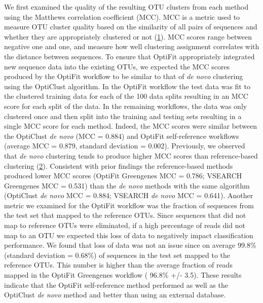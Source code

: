 \documentclass[
]{article}
\begin{document}
We first examined the quality of the resulting OTU clusters from each
method using the Matthews correlation coefficient (MCC). MCC is a metric
used to measure OTU cluster quality based on the similarity of all pairs
of sequences and whether they are appropriately clustered or not
(\protect\hyperlink{ref-westcott2015}{1}). MCC scores range between
negative one and one, and measure how well clustering assignment
correlates with the distance between sequences. To ensure that OptiFit
appropriately integrated new sequence data into the existing OTUs, we
expected the MCC scores produced by the OptiFit workflow to be similar
to that of \emph{de novo} clustering using the OptiClust algorithm. In
the OptiFit workflow the test data was fit to the clustered training
data for each of the 100 data splits resulting in an MCC score for each
split of the data. In the remaining workflows, the data was only
clustered once and then split into the training and testing sets
resulting in a single MCC score for each method. Indeed, the MCC scores
were similar between the OptiClust \emph{de novo} (MCC = 0.884) and
OptiFit self-reference workflows (average MCC = 0.879, standard
deviation = 0.002). Previously, we observed that \emph{de novo}
clustering tends to produce higher MCC scores than reference-based
clustering (\protect\hyperlink{ref-sovacool2022}{2}). Consistent with
prior findings the reference-based methods produced lower MCC scores
(OptiFit Greengenes MCC = 0.786; VSEARCH Greengenes MCC = 0.531) than
the \emph{de novo} methods with the same algorithm (OptiClust \emph{de
novo} MCC = 0.884; VSEARCH \emph{de novo} MCC = 0.641). Another metric
we examined for the OptiFit workflow was the fraction of sequences from
the test set that mapped to the reference OTUs. Since sequences that did
not map to reference OTUs were eliminated, if a high percentage of reads
did not map to an OTU we expected this loss of data to negatively impact
classification performance. We found that loss of data was not an issue
since on average 99.8\% (standard deviation = 0.68\%) of sequences in
the test set mapped to the reference OTUs. This number is higher than
the average fraction of reads mapped in the OptiFit Greengenes workflow
( 96.8\% +/- 3.5). These results indicate that the OptiFit
self-reference method performed as well as the OptiClust \emph{de novo}
method and better than using an external database.
\end{document}
